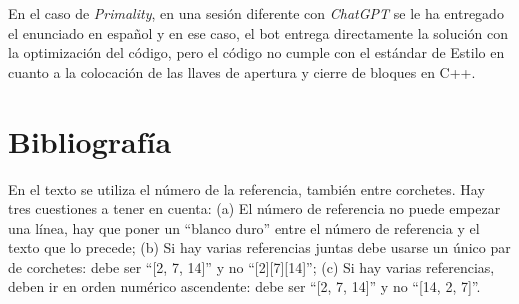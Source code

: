 \documentclass[twocolumn,twoside,a4paper, 10pt]{article}
\newcommand{\ChatGPT}{\textit{ChatGPT}{}}           %
\begin{document}
En el caso de \textit{Primality}, en una sesión diferente con \ChatGPT{} se le ha entregado el enunciado en español y
en ese caso, el bot entrega directamente la solución con la optimización del código, pero el código no cumple
con el estándar de Estilo en cuanto a la colocación de las llaves de apertura y cierre de bloques en C++.




\section{Bibliografía}
En el texto se utiliza el número de la referencia, también entre 
corchetes. Hay tres cuestiones a tener en cuenta: (a) El número de 
referencia no puede empezar una línea, hay que poner un ``blanco 
duro'' entre el número de referencia y el texto que lo precede; (b) 
Si hay varias referencias juntas debe usarse un único par de 
corchetes: debe ser ``[2, 7, 14]'' y no ``[2][7][14]''; (c) Si hay 
varias referencias, deben ir en orden numérico ascendente: debe ser  
``[2, 7, 14]'' y no ``[14, 2, 7]''.
\end{document}
